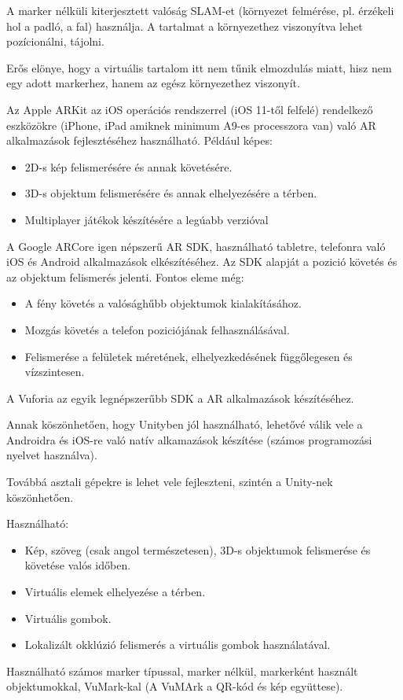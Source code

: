 A marker nélküli kiterjesztett valóság SLAM-et (környezet felmérése, pl. érzékeli hol a padló, a fal) használja. A tartalmat a környezethez viszonyítva lehet pozícionálni, tájolni.

Erős elönye, hogy a virtuális tartalom itt nem tűnik elmozdulás miatt, hisz nem egy adott markerhez,
hanem az egész környezethez viszonyít.



Az Apple ARKit az iOS operációs rendszerrel (iOS 11-től felfelé) rendelkező eszközökre (iPhone, iPad amiknek minimum A9-es processzora van) való AR alkalmazások fejlesztéséhez használható. 
Például képes: 
\begin{itemize}
\item 2D-s kép felismerésére és annak követésére.
\item 3D-s objektum felismerésére és annak elhelyezésére a térben.
\item Multiplayer játékok készítésére a legúabb verzióval
\end{itemize}


A Google ARCore igen népszerű AR SDK, használható tabletre, telefonra való iOS és Android alkalmazások elkészítéséhez. Az SDK alapját a pozició követés és az objektum felismerés jelenti.
Fontos eleme még:
\begin{itemize}
\item A fény követés a valósághűbb objektumok kialakításához.
\item Mozgás követés a telefon poziciójának felhasználásával.
\item Felismerése a  felületek méretének, elhelyezkedésének függőlegesen és vízszintesen.
\end{itemize}


A Vuforia az egyik legnépszerűbb SDK a AR alkalmazások készítéséhez.

Annak köszönhetően, hogy Unityben jól használható, lehetővé válik vele a Androidra és iOS-re való natív alkamazások készítése (számos programozási nyelvet használva).

Továbbá asztali gépekre is lehet vele fejleszteni, szintén a Unity-nek köszönhetően. 
  
Használható:
\begin{itemize}
\item  Kép, szöveg (csak angol természetesen), 3D-s objektumok felismerése és követése valós időben.
\item  Virtuális elemek elhelyezése a térben.  
\item  Virtuális gombok. 
\item  Lokalizált okklúzió felismerés a virtuális gombok használatával.
\end{itemize}
Használható számos marker típussal, marker nélkül, markerként használt objektumokkal, VuMark-kal (A VuMArk a QR-kód és kép együttese). 

